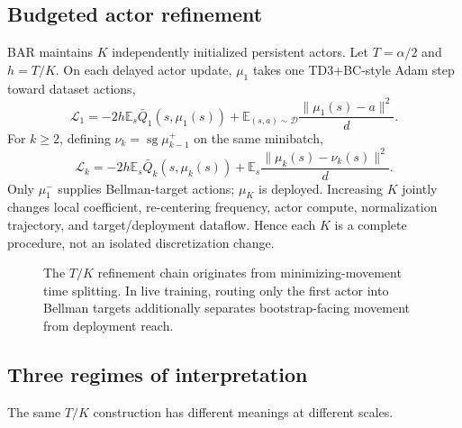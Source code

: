 \documentclass[twoside]{article}
\newcommand{\E}{\mathbb E}
\newcommand{\D}{\mathcal D}
\newcommand{\sg}{\operatorname{sg}}
\begin{document}
\subsection{Budgeted actor refinement}
BAR maintains $K$ independently initialized persistent actors. Let $T=\alpha/2$ and $h=T/K$. On each delayed actor update, $\mu_1$ takes one TD3+BC-style Adam step toward dataset actions,
\begin{equation}
\mathcal L_1=-2h\E_s\bar Q_1(s,\mu_1(s))+\E_{(s,a)\sim\D}\frac{\|\mu_1(s)-a\|^2}{d}.
\end{equation}
For $k\ge2$, defining $\nu_k=\sg\mu_{k-1}^{+}$ on the same minibatch,
\begin{equation}
\mathcal L_k=-2h\E_s\bar Q_k(s,\mu_k(s))+\E_s\frac{\|\mu_k(s)-\nu_k(s)\|^2}{d}.
\end{equation}
Only $\mu_1^-$ supplies Bellman-target actions; $\mu_K$ is deployed. Increasing $K$ jointly changes local coefficient, re-centering frequency, actor compute, normalization trajectory, and target/deployment dataflow. Hence each $K$ is a complete procedure, not an isolated discretization change.

\begin{figure}[t]
\centering
{}
\caption{The $T/K$ refinement chain originates from minimizing-movement time splitting. In live training, routing only the first actor into Bellman targets additionally separates bootstrap-facing movement from deployment reach.}
\label{fig:routing}
\end{figure}

\subsection{Three regimes of interpretation}
The same $T/K$ construction has different meanings at different scales.
\end{document}

